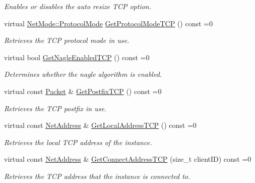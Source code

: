 \begin{DoxyCompactItemize}
\begin{DoxyCompactList}\small\item\em Enables or disables the auto resize TCP option. \item\end{DoxyCompactList}\item 
virtual \hyperlink{class_net_mode_a43cfa55ee6a4db66a8d7d6c27f766964}{NetMode::ProtocolMode} \hyperlink{class_net_instance_t_c_p_ad6252dc4923ef58376b2c36a5cb9cbe0}{GetProtocolModeTCP} () const =0
\begin{DoxyCompactList}\small\item\em Retrieves the TCP protocol mode in use. \item\end{DoxyCompactList}\item 
virtual bool \hyperlink{class_net_instance_t_c_p_a797c6d8f382ae72386afd0c52b45aa48}{GetNagleEnabledTCP} () const =0
\begin{DoxyCompactList}\small\item\em Determines whether the nagle algorithm is enabled. \item\end{DoxyCompactList}\item 
virtual const \hyperlink{class_packet}{Packet} \& \hyperlink{class_net_instance_t_c_p_a5509277d168a5be5d6ebc643afe34d3e}{GetPostfixTCP} () const =0
\begin{DoxyCompactList}\small\item\em Retrieves the TCP postfix in use. \item\end{DoxyCompactList}\item 
virtual const \hyperlink{class_net_address}{NetAddress} \& \hyperlink{class_net_instance_t_c_p_a01155c373c9794f98a69ac05d9a2491c}{GetLocalAddressTCP} () const =0
\begin{DoxyCompactList}\small\item\em Retrieves the local TCP address of the instance. \item\end{DoxyCompactList}\item 
virtual const \hyperlink{class_net_address}{NetAddress} \& \hyperlink{class_net_instance_t_c_p_ac856c99e8ebf03cd3822885521274ed7}{GetConnectAddressTCP} (size\_\-t clientID) const =0
\begin{DoxyCompactList}\small\item\em Retrieves the TCP address that the instance is connected to. \item\end{DoxyCompactList}\item 

\end{DoxyCompactItemize}
